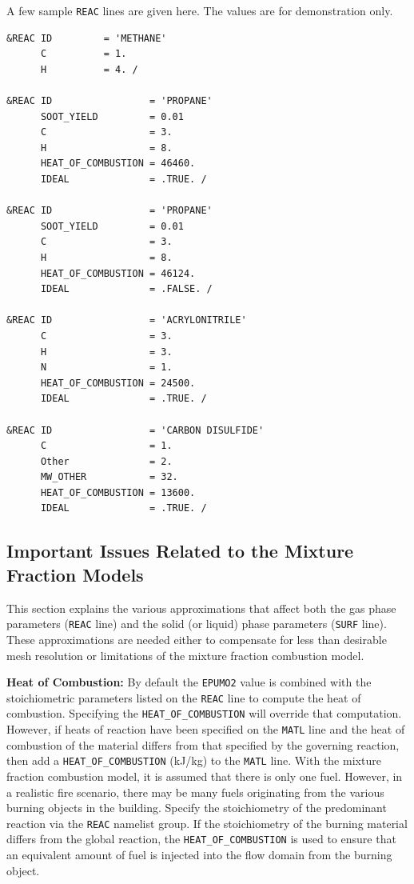 \documentclass[11pt]{book}
\newcommand{\ct}{\tt\small}
\begin{document}
\noindent
A few sample {\ct REAC} lines are given here. The values are for demonstration only.


\footnotesize
\begin{verbatim}
&REAC ID         = 'METHANE'
      C          = 1.
      H          = 4. /

&REAC ID                 = 'PROPANE'
      SOOT_YIELD         = 0.01
      C                  = 3.
      H                  = 8.
      HEAT_OF_COMBUSTION = 46460.
      IDEAL              = .TRUE. /

&REAC ID                 = 'PROPANE'
      SOOT_YIELD         = 0.01
      C                  = 3.
      H                  = 8.
      HEAT_OF_COMBUSTION = 46124.
      IDEAL              = .FALSE. /

&REAC ID                 = 'ACRYLONITRILE'
      C                  = 3.
      H                  = 3.
      N                  = 1.
      HEAT_OF_COMBUSTION = 24500.
      IDEAL              = .TRUE. /

&REAC ID                 = 'CARBON DISULFIDE'
      C                  = 1.
      Other              = 2.
      MW_OTHER           = 32.
      HEAT_OF_COMBUSTION = 13600.
      IDEAL              = .TRUE. /
\end{verbatim}
\normalsize



\subsection{Important Issues Related to the Mixture Fraction Models}
\label{info:combustion}

This section explains the various approximations that
affect both the gas phase parameters ({\ct REAC} line) and the
solid (or liquid) phase parameters ({\ct SURF} line). These
approximations are needed either to compensate for less than
desirable mesh resolution or limitations of the mixture fraction
combustion model.


\vspace{\baselineskip}
\noindent
{\bf Heat of Combustion:} By default the {\ct EPUMO2} value is combined with
the stoichiometric parameters listed
on the {\ct REAC} line to compute the heat of combustion.  Specifying the
{\ct HEAT\_OF\_COMBUSTION} will override that computation.
However, if heats of reaction have been specified on the
{\ct MATL} line and
the heat of combustion of the material differs from that specified by
the governing reaction, then add a
{\ct HEAT\_OF\_COMBUSTION} (kJ/kg) to the {\ct MATL} line.
With the mixture fraction combustion
model, it is assumed that there is only one fuel. However, in a realistic
fire scenario, there may be many fuels originating from the various
burning objects in the building. Specify
the stoichiometry of the predominant reaction via the {\ct REAC}
namelist group. If the stoichiometry of the burning material
differs from the global reaction, the {\ct HEAT\_OF\_COMBUSTION} is
used to ensure that an equivalent amount of fuel is injected into the
flow domain from the burning object.
\end{document}
